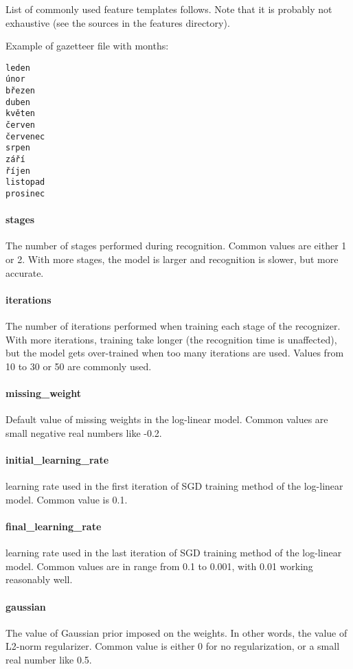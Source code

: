 List of commonly used feature templates follows. Note that it is probably not
exhaustive (see the sources in the features directory).

Example of gazetteer file with months:

\begin{lstlisting}[frame=single]
leden
únor
březen
duben
květen
červen
červenec
srpen
září
říjen
listopad
prosinec
\end{lstlisting}

\paragraph{stages}
The number of stages performed during recognition. Common values are either 1 or
2. With more stages, the model is larger and recognition is slower, but more accurate.

\paragraph{iterations}
The number of iterations performed when training each stage of the recognizer.
With more iterations, training take longer (the recognition time is unaffected),
but the model gets over-trained when too many iterations are used. Values from 10
to 30 or 50 are commonly used.

\paragraph{missing\_weight}
Default value of missing weights in the log-linear model. Common values are small
negative real numbers like -0.2.

\paragraph{initial\_learning\_rate}
learning rate used in the first iteration of SGD training method of the log-linear
model. Common value is 0.1.

\paragraph{final\_learning\_rate}
learning rate used in the last iteration of SGD training method of the log-linear
model. Common values are in range from 0.1 to 0.001, with 0.01 working reasonably well.

\paragraph{gaussian}
The value of Gaussian prior imposed on the weights. In other words, the value of
L2-norm regularizer. Common value is either 0 for no regularization, or a small
real number like 0.5.

